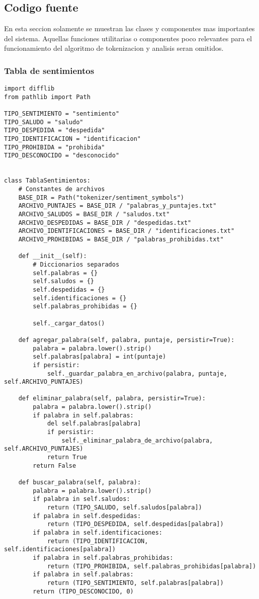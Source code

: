 \subsection{Codigo fuente}

En esta seccion solamente se muestran las clases y componentes mas importantes del sistema.
Aquellas funciones utilitarias o componentes poco relevantes para el funcionamiento del
algoritmo de tokenizacion y analisis seran omitidos.

\subsubsection{Tabla de sentimientos}
\begin{lstlisting}
import difflib
from pathlib import Path

TIPO_SENTIMIENTO = "sentimiento"
TIPO_SALUDO = "saludo"
TIPO_DESPEDIDA = "despedida"
TIPO_IDENTIFICACION = "identificacion"
TIPO_PROHIBIDA = "prohibida"
TIPO_DESCONOCIDO = "desconocido"


class TablaSentimientos:
    # Constantes de archivos
    BASE_DIR = Path("tokenizer/sentiment_symbols")
    ARCHIVO_PUNTAJES = BASE_DIR / "palabras_y_puntajes.txt"
    ARCHIVO_SALUDOS = BASE_DIR / "saludos.txt"
    ARCHIVO_DESPEDIDAS = BASE_DIR / "despedidas.txt"
    ARCHIVO_IDENTIFICACIONES = BASE_DIR / "identificaciones.txt"
    ARCHIVO_PROHIBIDAS = BASE_DIR / "palabras_prohibidas.txt"

    def __init__(self):
        # Diccionarios separados
        self.palabras = {}
        self.saludos = {}
        self.despedidas = {}
        self.identificaciones = {}
        self.palabras_prohibidas = {}

        self._cargar_datos()

    def agregar_palabra(self, palabra, puntaje, persistir=True):
        palabra = palabra.lower().strip()
        self.palabras[palabra] = int(puntaje)
        if persistir:
            self._guardar_palabra_en_archivo(palabra, puntaje, self.ARCHIVO_PUNTAJES)

    def eliminar_palabra(self, palabra, persistir=True):
        palabra = palabra.lower().strip()
        if palabra in self.palabras:
            del self.palabras[palabra]
            if persistir:
                self._eliminar_palabra_de_archivo(palabra, self.ARCHIVO_PUNTAJES)
            return True
        return False

    def buscar_palabra(self, palabra):
        palabra = palabra.lower().strip()
        if palabra in self.saludos:
            return (TIPO_SALUDO, self.saludos[palabra])
        if palabra in self.despedidas:
            return (TIPO_DESPEDIDA, self.despedidas[palabra])
        if palabra in self.identificaciones:
            return (TIPO_IDENTIFICACION, self.identificaciones[palabra])
        if palabra in self.palabras_prohibidas:
            return (TIPO_PROHIBIDA, self.palabras_prohibidas[palabra])
        if palabra in self.palabras:
            return (TIPO_SENTIMIENTO, self.palabras[palabra])
        return (TIPO_DESCONOCIDO, 0)


\end{lstlisting}
